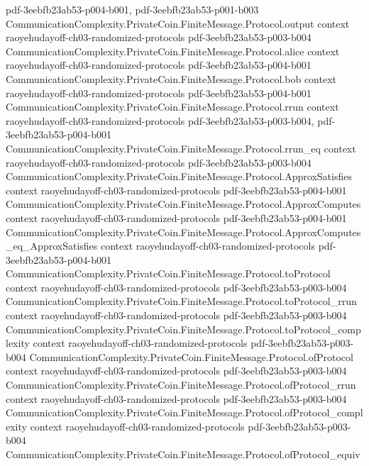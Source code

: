 \begin{theorem}
  {pdf-3eebfb23ab53-p004-b001,
    pdf-3eebfb23ab53-p001-b003}
\proofstep
  {CommunicationComplexity.PrivateCoin.FiniteMessage.Protocol.output}
  {context}
  {raoyehudayoff-ch03-randomized-protocols}
  {pdf-3eebfb23ab53-p003-b004}
\proofstep
  {CommunicationComplexity.PrivateCoin.FiniteMessage.Protocol.alice}
  {context}
  {raoyehudayoff-ch03-randomized-protocols}
  {pdf-3eebfb23ab53-p004-b001}
\proofstep
  {CommunicationComplexity.PrivateCoin.FiniteMessage.Protocol.bob}
  {context}
  {raoyehudayoff-ch03-randomized-protocols}
  {pdf-3eebfb23ab53-p004-b001}
\proofstep
  {CommunicationComplexity.PrivateCoin.FiniteMessage.Protocol.rrun}
  {context}
  {raoyehudayoff-ch03-randomized-protocols}
  {pdf-3eebfb23ab53-p003-b004,
    pdf-3eebfb23ab53-p004-b001}
\proofstep
  {CommunicationComplexity.PrivateCoin.FiniteMessage.Protocol.rrun_eq}
  {context}
  {raoyehudayoff-ch03-randomized-protocols}
  {pdf-3eebfb23ab53-p003-b004}
\proofstep
  {CommunicationComplexity.PrivateCoin.FiniteMessage.Protocol.ApproxSatisfies}
  {context}
  {raoyehudayoff-ch03-randomized-protocols}
  {pdf-3eebfb23ab53-p004-b001}
\proofstep
  {CommunicationComplexity.PrivateCoin.FiniteMessage.Protocol.ApproxComputes}
  {context}
  {raoyehudayoff-ch03-randomized-protocols}
  {pdf-3eebfb23ab53-p004-b001}
\proofstep
  {CommunicationComplexity.PrivateCoin.FiniteMessage.Protocol.ApproxComputes_eq_ApproxSatisfies}
  {context}
  {raoyehudayoff-ch03-randomized-protocols}
  {pdf-3eebfb23ab53-p004-b001}
\proofstep
  {CommunicationComplexity.PrivateCoin.FiniteMessage.Protocol.toProtocol}
  {context}
  {raoyehudayoff-ch03-randomized-protocols}
  {pdf-3eebfb23ab53-p003-b004}
\proofstep
  {CommunicationComplexity.PrivateCoin.FiniteMessage.Protocol.toProtocol_rrun}
  {context}
  {raoyehudayoff-ch03-randomized-protocols}
  {pdf-3eebfb23ab53-p003-b004}
\proofstep
  {CommunicationComplexity.PrivateCoin.FiniteMessage.Protocol.toProtocol_complexity}
  {context}
  {raoyehudayoff-ch03-randomized-protocols}
  {pdf-3eebfb23ab53-p003-b004}
\proofstep
  {CommunicationComplexity.PrivateCoin.FiniteMessage.Protocol.ofProtocol}
  {context}
  {raoyehudayoff-ch03-randomized-protocols}
  {pdf-3eebfb23ab53-p003-b004}
\proofstep
  {CommunicationComplexity.PrivateCoin.FiniteMessage.Protocol.ofProtocol_rrun}
  {context}
  {raoyehudayoff-ch03-randomized-protocols}
  {pdf-3eebfb23ab53-p003-b004}
\proofstep
  {CommunicationComplexity.PrivateCoin.FiniteMessage.Protocol.ofProtocol_complexity}
  {context}
  {raoyehudayoff-ch03-randomized-protocols}
  {pdf-3eebfb23ab53-p003-b004}
\proofstep
  {CommunicationComplexity.PrivateCoin.FiniteMessage.Protocol.ofProtocol_equiv}

\end{theorem}
